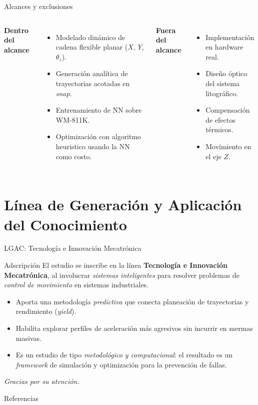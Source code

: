 \documentclass[en,16:9,navbarinline,bigfoot]{sdqbeamer}
\begin{document}
\begin{frame}{Alcances y exclusiones}
    \begin{columns}
        \textbf{Dentro del alcance}
        \begin{itemize}
            \item Modelado dinámico de cadena flexible planar ($X$, $Y$, $\theta_z$).
            \item Generación analítica de trayectorias acotadas en \textit{snap}.
            \item Entrenamiento de NN sobre WM-811K.
            \item Optimización con algoritmo heuristico usando la NN como costo.
        \end{itemize}
        \textbf{Fuera del alcance}
        \begin{itemize}
            \item Implementación en hardware real.
            \item Diseño óptico del sistema litográfico.
            \item Compensación de efectos térmicos.
            \item Movimiento en el eje $Z$.
        \end{itemize}
    \end{columns}
\end{frame}

\section{Línea de Generación y Aplicación del Conocimiento}

\begin{frame}{LGAC: Tecnología e Innovación Mecatrónica}
    \begin{purpleblock}{Adscripción}
        El estudio se inscribe en la línea \textbf{Tecnología e Innovación Mecatrónica}, al involucrar \emph{sistemas inteligentes} para resolver problemas de \emph{control de movimiento} en sistemas industriales.
    \end{purpleblock}
    \vspace{0.2cm}
    \begin{itemize}
        \item Aporta una metodología \emph{predictiva} que conecta planeación de trayectorias y rendimiento (\textit{yield}).
        \item Habilita explorar perfiles de aceleración más agresivos sin incurrir en mermas masivas.
        \item Es un estudio de tipo \emph{metodológico y computacional}: el resultado es un \emph{framework} de simulación y optimización para la prevención de fallas.
    \end{itemize}
    \vspace{0.4cm}
    \begin{center}
    \textit{Gracias por su atención.}
    \end{center}
\end{frame}

\appendix
\beginbackup
\begin{frame}[allowframebreaks]{Referencias}
\printbibliography
\end{frame}
\backupend
\end{document}
